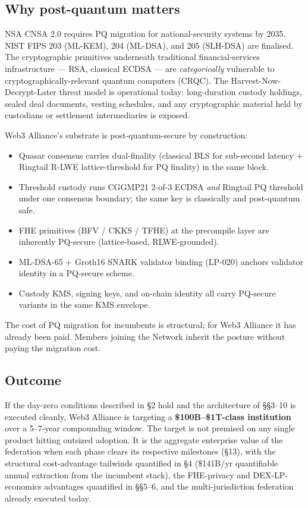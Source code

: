 \subsection{Why post-quantum matters}

NSA CNSA 2.0 requires PQ migration for national-security systems by
2035. NIST FIPS 203 (ML-KEM), 204 (ML-DSA), and 205 (SLH-DSA) are
finalised. The cryptographic primitives underneath traditional
financial-services infrastructure --- RSA, classical ECDSA --- are
\emph{categorically} vulnerable to cryptographically-relevant quantum
computers (CRQC). The Harvest-Now-Decrypt-Later threat model is
operational today: long-duration custody holdings, sealed deal
documents, vesting schedules, and any cryptographic material held by
custodians or settlement intermediaries is exposed.

Web3 Alliance's substrate is post-quantum-secure by construction:

\begin{itemize}[leftmargin=2em,itemsep=0.1em]
\item Quasar consensus carries dual-finality (classical BLS for
sub-second latency + Ringtail R-LWE lattice-threshold for PQ
finality) in the same block.
\item Threshold custody runs CGGMP21 2-of-3 ECDSA \emph{and} Ringtail
PQ threshold under one consensus boundary; the same key is
classically and post-quantum safe.
\item FHE primitives (BFV / CKKS / TFHE) at the precompile layer are
inherently PQ-secure (lattice-based, RLWE-grounded).
\item ML-DSA-65 + Groth16 SNARK validator binding (LP-020) anchors
validator identity in a PQ-secure scheme.
\item Custody KMS, signing keys, and on-chain identity all carry
PQ-secure variants in the same KMS envelope.
\end{itemize}

The cost of PQ migration for incumbents is structural; for Web3 Alliance
it has already been paid. Members joining the Network inherit the
posture without paying the migration cost.

\subsection{Outcome}

If the day-zero conditions described in \S 2 hold and the architecture
of \S\S 3--10 is executed cleanly, Web3 Alliance is targeting a
\textbf{\$100B--\$1T-class institution} over a 5--7-year compounding
window. The target is not premised on any single product hitting
outsized adoption. It is the aggregate enterprise value of the
federation when each phase clears its respective milestones (\S 13),
with the structural cost-advantage tailwinds quantified in \S 4
(\$141B/yr quantifiable annual extraction from the incumbent stack),
the FHE-privacy and DEX-LP-economics advantages quantified in \S\S 5--6,
and the multi-jurisdiction federation already executed today.

